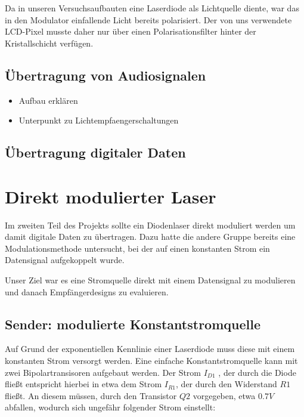 \documentclass[12pt,a4paper]{article}
\begin{document}
Da in unseren Versuchsaufbauten eine Laserdiode als Lichtquelle diente, war das in den Modulator einfallende Licht bereits polarisiert. Der von uns verwendete LCD-Pixel musste daher nur über einen Polarisationsfilter hinter der Kristallschicht verfügen.



\subsection{Übertragung von Audiosignalen}
\begin{itemize}
\item Aufbau erklären
\item Unterpunkt zu Lichtempfaengerschaltungen
\end{itemize}

\subsection{Übertragung digitaler Daten}





\section{Direkt modulierter Laser}
Im zweiten Teil des Projekts sollte ein Diodenlaser direkt moduliert werden um damit digitale Daten zu übertragen. Dazu hatte die andere Gruppe bereits eine Modulationsmethode untersucht, bei der auf einen konstanten Strom ein Datensignal aufgekoppelt wurde.

Unser Ziel war es eine Stromquelle direkt mit einem Datensignal zu modulieren und danach Empfängerdesigns zu evaluieren.


\subsection{Sender: modulierte Konstantstromquelle}
\label{sec:direct_tx}
Auf Grund der exponentiellen Kennlinie einer Laserdiode muss diese mit einem konstanten Strom versorgt werden. Eine einfache Konstantstromquelle kann mit zwei Bipolartransisoren aufgebaut werden. Der Strom $I_{D1}$ , der durch die Diode fließt entspricht hierbei in etwa dem Strom $I_{R1}$, der durch den Widerstand $R1$ fließt. An diesem müssen, durch den Transistor  $Q2$ vorgegeben, etwa $0.7V$ abfallen, wodurch sich ungefähr folgender Strom einstellt:
\end{document}
